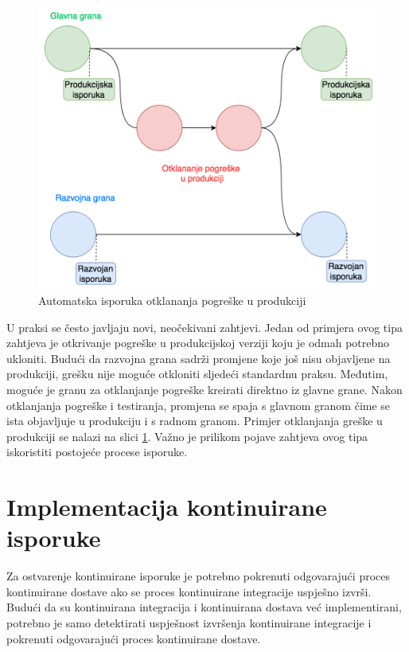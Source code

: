 \documentclass[times, utf8, diplomski, numeric]{fer}
\begin{document}
\begin{figure}
\centering
\includegraphics[scale=0.5]{HotfixGitflow}
\caption{Automatska isporuka otklananja pogreške u produkciji}
\label{fig:HotfixGitflow}
\end{figure}

U praksi se često javljaju novi, neočekivani zahtjevi. Jedan od primjera ovog tipa zahtjeva je otkrivanje pogreške u produkcijskoj verziji koju je odmah potrebno ukloniti. Budući da razvojna grana sadrži promjene koje još nisu objavljene na produkciji, grešku nije moguće otkloniti sljedeći standardnu praksu. Međutim, moguće je granu za otklanjanje pogreške kreirati direktno iz glavne grane. Nakon otklanjanja pogreške i testiranja, promjena se spaja s glavnom granom čime se ista objavljuje u produkciju i s radnom granom. Primjer otklanjanja greške u produkciji se nalazi na slici \ref{fig:HotfixGitflow}. Važno je prilikom pojave zahtjeva ovog tipa iskoristiti postojeće procese isporuke.


\section{Implementacija kontinuirane isporuke}

Za ostvarenje kontinuirane isporuke je potrebno pokrenuti odgovarajući proces kontinuirane dostave ako se proces kontinuirane integracije uspješno izvrši. Budući da su kontinuirana integracija i kontinuirana dostava već implementirani, potrebno je samo detektirati uspješnost izvršenja kontinuirane integracije i pokrenuti odgovarajući proces kontinuirane dostave.
\end{document}
